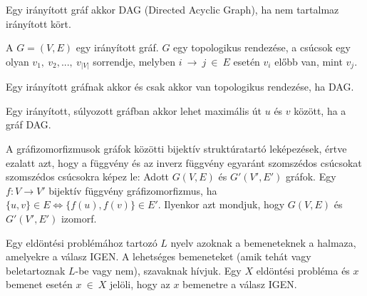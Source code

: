   \begin{definition} [DAG]
    Egy irányított gráf akkor DAG (Directed Acyclic Graph), ha nem tartalmaz irányított kört.
  \end{definition}

  \begin{definition} 
    A $G=(V,E)$ egy irányított gráf. $G$ egy topologikus rendezése, a csúcsok egy olyan $v_{1},~v_{2},...,~v_{|V|}$ sorrendje, melyben $i~\rightarrow~j~\in~E$ esetén $v_i$ előbb van, mint $v_j$.
  \end{definition}

  \begin{theorem} 
    Egy irányított gráfnak akkor és csak akkor van topologikus rendezése, ha DAG.
  \end{theorem}

  \begin{theorem} \label{max_route}
    Egy irányított, súlyozott gráfban akkor lehet maximális út $u$ és $v$ között, ha a gráf DAG.
  \end{theorem}

  \begin{definition} \label{grafizo}
    A gráfizomorfizmusok gráfok közötti bijektív struktúratartó leképezések, értve ezalatt azt, hogy a függvény és az inverz függvény egyaránt szomszédos csúcsokat szomszédos csúcsokra képez le:
    Adott $G(V,E)$ és $G'(V',E')$ gráfok. Egy $f:V \rightarrow V'$ bijektív függvény gráfizomorfizmus, ha $\{u,v\}\in E \Leftrightarrow \{f(u),f(v)\}\in E'$. Ilyenkor azt mondjuk, hogy $G(V,E)$ és $G'(V',E')$ izomorf.
  \end{definition}

  \begin{definition} \label{eldontesi_def}
    Egy eldöntési problémához tartozó $L$ nyelv azoknak a bemeneteknek a halmaza, amelyekre a válasz IGEN. A lehetséges bemeneteket (amik tehát vagy beletartoznak $L$-be vagy nem), szavaknak hívjuk. Egy $X$ eldöntési probléma és $x$ bemenet esetén $x~\in~X$ jelöli, hogy az $x$ bemenetre a válasz IGEN.
  \end{definition}

  \newpage

